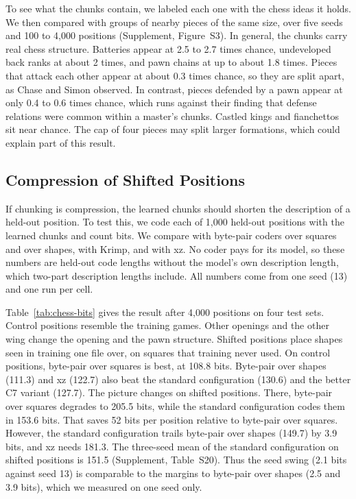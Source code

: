 \documentclass[11pt,letterpaper]{article}
\begin{document}
To see what the chunks contain, we labeled each one with the chess ideas it holds. We then compared with groups of nearby pieces of the same size, over five seeds and 100 to 4,000 positions (Supplement, Figure~S3).
In general, the chunks carry real chess structure. Batteries appear at 2.5 to 2.7 times chance, undeveloped back ranks at about 2 times, and pawn chains at up to about 1.8 times.
Pieces that attack each other appear at about 0.3 times chance, so they are split apart, as Chase and Simon observed.
In contrast, pieces defended by a pawn appear at only 0.4 to 0.6 times chance, which runs against their finding that defense relations were common within a master's chunks.
Castled kings and fianchettos sit near chance. The cap of four pieces may split larger formations, which could explain part of this result.

\subsection{Compression of Shifted Positions}

If chunking is compression, the learned chunks should shorten the description of a held-out position. To test this, we code each of 1,000 held-out positions with the learned chunks and count bits.
We compare with byte-pair coders over squares and over shapes, with Krimp, and with xz.
No coder pays for its model, so these numbers are held-out code lengths without the model's own description length, which two-part description lengths include.
All numbers come from one seed (13) and one run per cell.

Table~\ref{tab:chess-bits} gives the result after 4,000 positions on four test sets. Control positions resemble the training games. Other openings and the other wing change the opening and the pawn structure.
Shifted positions place shapes seen in training one file over, on squares that training never used.
On control positions, byte-pair over squares is best, at 108.8 bits. Byte-pair over shapes (111.3) and xz (122.7) also beat the standard configuration (130.6) and the better C7 variant (127.7).
The picture changes on shifted positions. There, byte-pair over squares degrades to 205.5 bits, while the standard configuration codes them in 153.6 bits.
That saves 52 bits per position relative to byte-pair over squares. However, the standard configuration trails byte-pair over shapes (149.7) by 3.9 bits, and xz needs 181.3.
The three-seed mean of the standard configuration on shifted positions is 151.5 (Supplement, Table~S20). Thus the seed swing (2.1 bits against seed 13) is comparable to the margins to byte-pair over shapes (2.5 and 3.9 bits), which we measured on one seed only.
\end{document}
